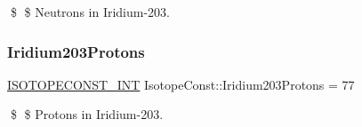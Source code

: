 \$ \$ Neutrons in Iridium-\/203. \mbox{\label{group___isotope_const-_iridium-_ir203_gab9c223dd693c5fa0d69a975171743780}} 
\subsubsection{\texorpdfstring{Iridium203\+Protons}{Iridium203Protons}}
{\footnotesize\ttfamily \mbox{\hyperlink{group___isotope_const-_macros_ga5f18360b3e99483a35c32d789e62621c}{I\+S\+O\+T\+O\+P\+E\+C\+O\+N\+S\+T\+\_\+\+I\+NT}} Isotope\+Const\+::\+Iridium203\+Protons = 77}

\$ \$ Protons in Iridium-\/203. 
